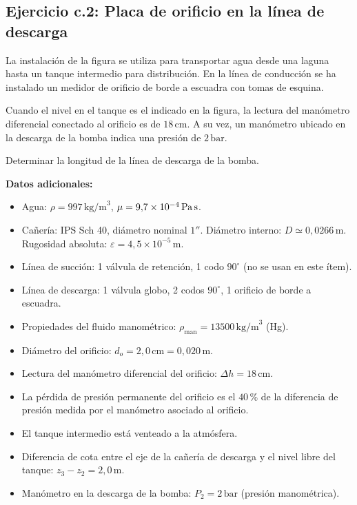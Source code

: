 \documentclass[12pt, a4paper]{article}
\begin{document}

\subsection*{Ejercicio c.2: Placa de orificio en la línea de descarga}

La instalación de la figura se utiliza para transportar agua desde una laguna hasta un
tanque intermedio para distribución. En la línea de conducción se ha instalado un
medidor de orificio de borde a escuadra con tomas de esquina. 

Cuando el nivel en el tanque es el indicado en la figura, la lectura del manómetro
diferencial conectado al orificio es de $18\,\text{cm}$. A su vez, un manómetro ubicado
en la descarga de la bomba indica una presión de $2\,\text{bar}$.

Determinar la longitud de la línea de descarga de la bomba.

\medskip

\noindent
\textbf{Datos adicionales:}
\begin{itemize}
  \item Agua: $\rho = 997\,\text{kg/m}^3$, $\mu = 9{,}7\times 10^{-4}\,\text{Pa\,s}$.
  \item Cañería: IPS Sch 40, diámetro nominal $1''$.
        Diámetro interno: $D \simeq 0{,}0266\,\text{m}$.
        Rugosidad absoluta: $\varepsilon = 4{,}5\times 10^{-5}\,\text{m}$.
  \item Línea de succión: 1 válvula de retención, 1 codo $90^\circ$ (no se usan en este ítem).
  \item Línea de descarga: 1 válvula globo, 2 codos $90^\circ$, 1 orificio de borde a escuadra.
  \item Propiedades del fluido manométrico: $\rho_\text{man} = 13500\,\text{kg/m}^3$ (Hg).
  \item Diámetro del orificio: $d_o = 2{,}0\,\text{cm} = 0{,}020\,\text{m}$.
  \item Lectura del manómetro diferencial del orificio: $\Delta h = 18\,\text{cm}$.
  \item La pérdida de presión permanente del orificio es el $40\,\%$ de la
        diferencia de presión medida por el manómetro asociado al orificio.
  \item El tanque intermedio está venteado a la atmósfera.
  \item Diferencia de cota entre el eje de la cañería de descarga y el nivel
        libre del tanque: $z_3 - z_2 = 2{,}0\,\text{m}$.
  \item Manómetro en la descarga de la bomba: $P_2 = 2\,\text{bar}$ (presión manométrica).
\end{itemize}
\end{document}

